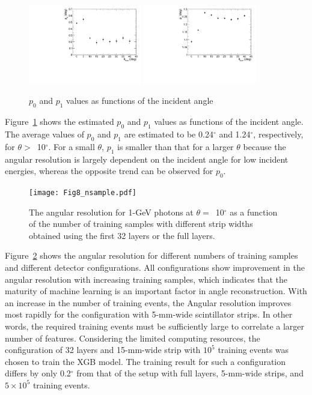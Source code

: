 \documentclass[preprint,12pt,times,a4paper]{elsarticle}
\begin{document}
\begin{figure}[!hbt]
\centering
\includegraphics[width=0.44\textwidth]{Fig7_p0.pdf}
\includegraphics[width=0.44\textwidth]{Fig7_p1.pdf}
\caption{ $p_{0}$ and $p_{1}$ values as functions of the incident angle }
\label{fig:res_edep}
\end{figure}

Figure~\ref{fig:res_edep} shows the estimated $p_{0}$ and $p_{1}$ values as functions of the incident angle. The average values of $p_{0}$ and $p_{1}$ are estimated to be 0.24$^{\circ}$ and 1.24$^{\circ}$, respectively, for $\theta>$~10$^{\circ}$. For a small $\theta$, $p_{1}$ is smaller than that for a larger $\theta$ because the angular resolution is largely dependent on the incident angle for low incident energies, whereas the opposite trend can be observed for $p_{0}$.

\begin{figure}[!hbt]
\centering
\texttt{[image: Fig8\_nsample.pdf]}
\caption{ The angular resolution for 1-GeV photons at $\theta=$~10$^{\circ}$ as a function of the number of training samples with different strip widths obtained using the first 32 layers or the full layers. }
\label{fig:multi-parameter}
\end{figure}

Figure~\ref{fig:multi-parameter} shows the angular resolution for different numbers of training samples and different detector configurations. All configurations show improvement in the angular resolution with increasing training samples, which indicates that the maturity of machine learning is an important factor in angle reconstruction. With an increase in the number of training events, the Angular resolution improves most rapidly for the configuration with 5-mm-wide scintillator strips. In other words, the required training events must be sufficiently large to correlate a larger number of features. Considering the limited computing resources, the configuration of 32 layers and 15-mm-wide strip with $10^{5}$ training events was chosen to train the XGB model. The training result for such a configuration differs by only 0.2$^{\circ}$ from that of the setup with full layers, 5-mm-wide strips, and $5\times10^{5}$ training events.
 
\end{document}
